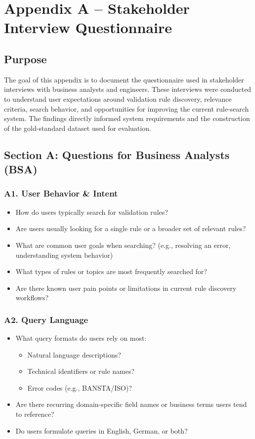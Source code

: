 \chapter{Appendix A – Stakeholder Interview Questionnaire}

\section{Purpose}
The goal of this appendix is to document the questionnaire used in stakeholder interviews with business analysts and engineers. 
These interviews were conducted to understand user expectations around validation rule discovery, relevance criteria, search behavior, and opportunities for improving the current rule-search system.
The findings directly informed system requirements and the construction of the gold-standard dataset used for evaluation.

\section{Section A: Questions for Business Analysts (BSA)}
\subsection{A1. User Behavior \& Intent}
\begin{itemize}
  \item How do users typically search for validation rules?
  \item Are users usually looking for a single rule or a broader set of relevant rules?
  \item What are common user goals when searching? (e.g., resolving an error, understanding system behavior)
  \item What types of rules or topics are most frequently searched for?
  \item Are there known user pain points or limitations in current rule discovery workflows?
\end{itemize}

\subsection{A2. Query Language}
\begin{itemize}
  \item What query formats do users rely on most:
  \begin{itemize}
    \item Natural language descriptions?
    \item Technical identifiers or rule names?
    \item Error codes (e.g., BANSTA/ISO)?
  \end{itemize}
  \item Are there recurring domain-specific field names or business terms users tend to reference?
  \item Do users formulate queries in English, German, or both?
\end{itemize}


